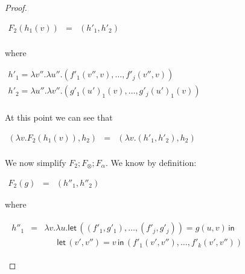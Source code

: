 \begin{proof}
\begin{report}
\begin{center}
\begin{itemize}
\begin{center}
\begin{math}
          \begin{array}{lll}
            F_2(h_1(v))
            & = & (h'_1,h'_2)\\
          \end{array}
        \end{math}
      \end{center}
      where
      \begin{center}
        \begin{math}
          \begin{array}{lll}
            h'_1 = \lambda v''.\lambda u''.(f'_1(v'',v),\ldots,f'_j(v'',v))\\
            h'_2 = \lambda u''.\lambda v''.(g'_1(u')_1(v),\ldots,g'_j(u')_1(v))\\
          \end{array}
        \end{math}
      \end{center}
      At this point we can see that
      \begin{center}
        \begin{math}
          \begin{array}{lll}
            (\lambda v.F_2(h_1(v)),h_2) & = & (\lambda v.(h'_1,h'_2),h_2)\\
          \end{array}
        \end{math}
      \end{center}
      We now simplify $F_2;F_\otimes;F_\alpha$.  We know by definition:
      \begin{center}
        \begin{math}
          \begin{array}{lll}
            F_2(g) & = & (h''_1,h''_2)
          \end{array}
        \end{math}
      \end{center}
      where
      \begin{center}
        \begin{math}
          \begin{array}{lll}
            \begin{array}{lll}
              h''_1 & = & \lambda v.\lambda u.\mathsf{let}\,((f'_1,g'_1),\ldots,(f'_j,g'_j)) = g(u,v)\,\mathsf{in}\\
              & & \,\,\,\,\,\,\,\,\,\mathsf{let}\,(v',v'') = v\,\mathsf{in}\,(f'_1(v',v''),\ldots,f'_k(v',v''))
              

\end{array}
\end{array}
\end{math}
\end{center}
\end{itemize}
\end{center}
\end{report}
\end{proof}
